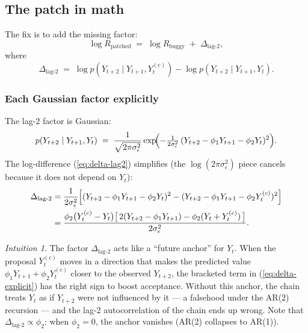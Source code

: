 \documentclass[11pt]{article}
\newcommand{\eref}[1]{(\ref{#1})}
\theoremstyle{plain}
\theoremstyle{definition}
\theoremstyle{remark}
\newtheorem*{intuition}{Intuition}
\begin{document}
\subsection{The patch in math}\label{sec:patch-math}

The fix is to add the missing factor:
\begin{equation}\label{eq:patch}
  \boxed{\;
    \log R_{\mathrm{patched}}
    \;=\; \log R_{\mathrm{buggy}}
        \;+\;\Delta_{\text{lag-2}},
  \;}
\end{equation}
where
\begin{equation}\label{eq:delta-lag2}
  \Delta_{\text{lag-2}}
  \;=\;
  \log p(Y_{t+2} \mid Y_{t+1}, Y_t^{(c)})
  - \log p(Y_{t+2} \mid Y_{t+1}, Y_t).
\end{equation}

\subsubsection{Each Gaussian factor explicitly}

The lag-2 factor is Gaussian:
\[
  p(Y_{t+2} \mid Y_{t+1}, Y_t)
  \;=\; \frac{1}{\sqrt{2\pi\sigma_\epsilon^2}}
        \exp\!\Bigl(-\tfrac{1}{2\sigma_\epsilon^2}\,
                    (Y_{t+2} - \phi_1 Y_{t+1} - \phi_2 Y_t)^2\Bigr).
\]
The log-difference \eref{eq:delta-lag2} simplifies (the
$\log(2\pi\sigma_\epsilon^2)$ piece cancels because it does not depend on
$Y_t$):
\begin{align}
  \Delta_{\text{lag-2}}
  &= \frac{1}{2\sigma_\epsilon^2}
     \Bigl[(Y_{t+2} - \phi_1 Y_{t+1} - \phi_2 Y_t)^2
         - (Y_{t+2} - \phi_1 Y_{t+1} - \phi_2 Y_t^{(c)})^2\Bigr] \notag\\
  &= \frac{\phi_2\bigl(Y_t^{(c)} - Y_t\bigr)
           \bigl[\,2(Y_{t+2} - \phi_1 Y_{t+1}) - \phi_2(Y_t + Y_t^{(c)})\,\bigr]}
          {2\sigma_\epsilon^2}.
  \label{eq:delta-explicit}
\end{align}

\begin{intuition}
The factor $\Delta_{\text{lag-2}}$ acts like a ``future anchor'' for
$Y_t$. When the proposal $Y_t^{(c)}$ moves in a direction that makes the
predicted value $\phi_1 Y_{t+1} + \phi_2 Y_t^{(c)}$ closer to the
observed $Y_{t+2}$, the bracketed term in \eref{eq:delta-explicit}
has the right sign to boost acceptance. Without this anchor, the chain
treats $Y_t$ as if $Y_{t+2}$ were not influenced by it --- a falsehood
under the AR(2) recursion --- and the lag-2 autocorrelation of the chain
ends up wrong. Note that $\Delta_{\text{lag-2}} \propto \phi_2$: when
$\phi_2 = 0$, the anchor vanishes (AR(2) collapses to AR(1)).
\end{intuition}
\end{document}
